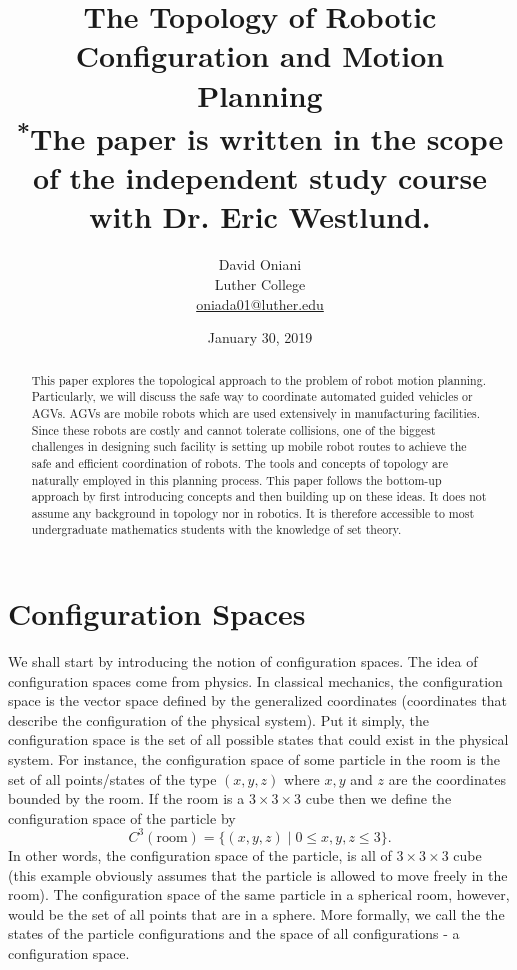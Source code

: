 \documentclass[12pt]{article}
\title{The Topology of Robotic Configuration and Motion Planning\\
{\small \textsuperscript{*}The paper is written in the scope of the independent study course with Dr. Eric Westlund.}}
\author{David Oniani\\Luther College\\\href{mailto:oniada01@luther.edu}{oniada01@luther.edu}}
\date{January 30, 2019}
\theoremstyle{definition}
\begin{document}
\maketitle


\begin{abstract}
\noindent This paper explores the topological approach to the problem
of robot motion planning. Particularly, we will discuss
the safe way to coordinate automated guided vehicles or AGVs.
AGVs are mobile robots which are used extensively in manufacturing
facilities. Since these robots are costly and cannot tolerate collisions,
one of the biggest challenges in designing such facility is setting up
mobile robot routes to achieve the safe and efficient coordination of robots.
The tools and concepts of topology are naturally employed in this planning
process. This paper follows the bottom-up approach by first introducing
concepts and then building up on these ideas. It does not assume any background
in topology nor in robotics. It is therefore accessible to most undergraduate
mathematics students with the knowledge of set theory.
\end{abstract}


\section*{\centering Configuration Spaces}
We shall start by introducing the notion of configuration spaces.
The idea of configuration spaces come from physics. In classical mechanics,
the configuration space is the vector space defined by the generalized
coordinates (coordinates that describe the configuration of the physical system).
Put it simply, the configuration space is the set of all possible states that
could exist in the physical system. For instance, the configuration space of some
particle in the room is the set of all points/states of the type $(x, y, z)$ where
$x, y$ and $z$ are the coordinates bounded by the room. If the room is a $3 \times 3 \times 3$
cube then we define the configuration space of the particle by
$$C^3(\text{room}) = \{(x, y, z) \mid 0 \leq x, y, z \leq 3\}.$$
In other words, the configuration space of the particle, is all of $3 \times 3 \times 3$ cube
(this example obviously assumes that the particle is allowed to move freely in the room).
The configuration space of the same particle in a spherical room, however, would be the set of all
points that are in a sphere. More formally, we call the the states of the particle configurations
and the space of all configurations - a configuration space.
\end{document}
